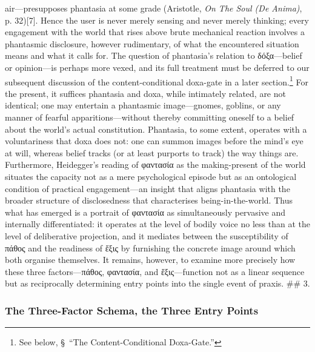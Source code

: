 \documentclass{article}
\begin{document}
air—presupposes phantasia at some grade (Aristotle, \textit{On The Soul (De Anima)}, p. 32)[7]. Hence the user is never merely sensing and never merely thinking; every engagement with the world that rises above brute mechanical reaction involves a phantasmic disclosure, however rudimentary, of what the encountered situation means and what it calls for. The question of phantasia's relation to δόξα—belief or opinion—is perhaps more vexed, and its full treatment must be deferred to our subsequent discussion of the content-conditional doxa-gate in a later section.\footnote{See below, \S\ ``The Content-Conditional Doxa-Gate.''} For the present, it suffices phantasia and doxa, while intimately related, are not identical; one may entertain a phantasmic image—gnomes, goblins, or any manner of fearful apparitions—without thereby committing oneself to a belief about the world's actual constitution. Phantasia, to some extent, operates with a voluntariness that doxa does not: one can summon images before the mind's eye at will, whereas belief tracks (or at least purports to track) the way things are. Furthermore, Heidegger's reading of φαντασία as the making-present of the world situates the capacity not as a mere psychological episode but as an ontological condition of practical engagement—an insight that aligns phantasia with the broader structure of disclosedness that characterises being-in-the-world. Thus what has emerged is a portrait of φαντασία as simultaneously pervasive and internally differentiated: it operates at the level of bodily voice no less than at the level of deliberative projection, and it mediates between the susceptibility of πάθος and the readiness of ἕξις by furnishing the concrete image around which both organise themselves. It remains, however, to examine more precisely how these three factors—πάθος, φαντασία, and ἕξις—function not as a linear sequence but as reciprocally determining entry points into the single event of praxis. ## 3. 

\subsubsection*{The Three-Factor Schema, the Three Entry Points}
\end{document}
